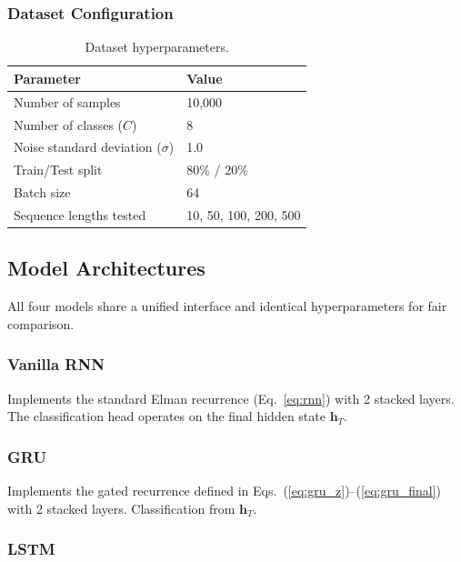 \documentclass[12pt, a4paper]{article}
\begin{document}
\subsubsection{Dataset Configuration}

\begin{table}[H]
    \centering
    \caption{Dataset hyperparameters.}
    \label{tab:dataset_config}
    \begin{tabular}{ll}
        \toprule
        \textbf{Parameter} & \textbf{Value} \\
        \midrule
        Number of samples & 10,000 \\
        Number of classes ($C$) & 8 \\
        Noise standard deviation ($\sigma$) & 1.0 \\
        Train/Test split & 80\% / 20\% \\
        Batch size & 64 \\
        Sequence lengths tested & 10, 50, 100, 200, 500 \\
        \bottomrule
    \end{tabular}
\end{table}

\subsection{Model Architectures}

All four models share a unified interface and identical hyperparameters for fair comparison.

\subsubsection{Vanilla RNN}

Implements the standard Elman recurrence (Eq.~\ref{eq:rnn}) with 2 stacked layers. The classification head operates on the final hidden state $\mathbf{h}_T$.

\subsubsection{GRU}

Implements the gated recurrence defined in Eqs.~(\ref{eq:gru_z})--(\ref{eq:gru_final}) with 2 stacked layers. Classification from $\mathbf{h}_T$.

\subsubsection{LSTM}
\end{document}
